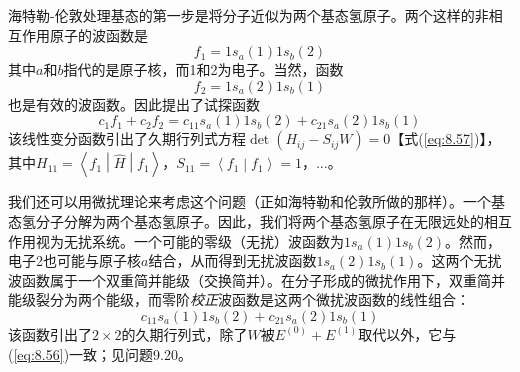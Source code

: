     海特勒-伦敦处理基态的第一步是将分子近似为两个基态氢原子。两个这样的非相互作用原子的波函数是
    \begin{equation*}
        f_1 = 1s_a\left(1\right)1s_b\left(2\right)
    \end{equation*}
    其中$a$和$b$指代的是原子核，而1和2为电子。当然，函数
    \begin{equation*}
        f_2 = 1s_a\left(2\right)1s_b\left(1\right)
    \end{equation*}
    也是有效的波函数。因此提出了试探函数
    \begin{equation}
        c_1f_1 + c_2f_2 = c_11s_a\left(1\right)1s_b\left(2\right) + c_21s_a\left(2\right)1s_b\left(1\right)
        \label{eq:13.96}
    \end{equation}
    该线性变分函数引出了久期行列式方程$\det\left(H_{ij} - S_{ij}W\right) = 0$【式(\ref{eq:8.57})】，其中$H_{11} = \left\langle f_1 \middle| \hat{H} \middle| f_1 \right\rangle$，$S_{11} = \left\langle f_1 \middle| f_1 \right\rangle = 1$，$\ldots$。

    我们还可以用微扰理论来考虑这个问题（正如海特勒和伦敦所做的那样）。一个基态氢分子分解为两个基态氢原子。因此，我们将两个基态氢原子在无限远处的相互作用视为无扰系统。一个可能的零级（无扰）波函数为$1s_a\left(1\right)1s_b\left(2\right)$。然而，电子2也可能与原子核$a$结合，从而得到无扰波函数$1s_a\left(2\right)1s_b\left(1\right)$。这两个无扰波函数属于一个双重简并能级（交换简并）。在分子形成的微扰作用下，双重简并能级裂分为两个能级，而零阶\textit{校正}波函数是这两个微扰波函数的线性组合：
    \begin{equation*}
        c_11s_a\left(1\right)1s_b\left(2\right) + c_21s_a\left(2\right)1s_b\left(1\right)
    \end{equation*}
    该函数引出了$2\times2$的久期行列式，除了$W$被$E^{\left(0\right)} + E^{\left(1\right)}$取代以外，它与(\ref{eq:8.56})一致；见问题9.20。

